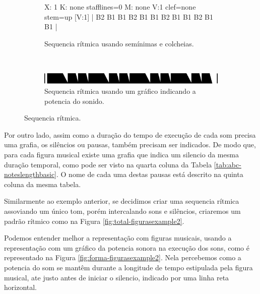 \begin{figure}[h]
    \centering
    \begin{subfigure}[b]{0.9\textwidth}
 \begin{abc}[name=abc-figurasexample1]
%
X: 1 %
K: none stafflines=0 %
M:  none %
V:1 clef=none stem=up %
%
[V:1] | B2 B1 B1 B2 B1 B1 B2 B1 B1 B2  B1 B1   |
%       
\end{abc}
	\caption{Sequencia rítmica usando semínimas e colcheias.}
	\label{fig:abc-figurasexample1}
    \end{subfigure}
    ~%
    \begin{subfigure}[b]{0.9\textwidth}
        \includegraphics[width=\textwidth]{chapters/cap-musica-basica/forma-figurasexample1.eps}
        \caption{Sequencia rítmica usando um gráfico indicando a potencia do sonido.}
        \label{fig:forma-figurasexample1b}
    \end{subfigure}
    \caption{Sequencia rítmica.}\label{fig:total-figurasexample1}
\end{figure}


Por outro lado, assim como a duração do tempo de execução de cada som precisa uma grafia,
os silêncios ou pausas, também precisam ser indicados. 
De modo que, para cada figura musical existe uma grafia que indica um silencio da mesma duração temporal,
como pode ser visto na quarta coluna da Tabela \ref{tab:abc-noteslengthbasic}.
O nome de cada uma destas pausas está descrito na quinta coluna da mesma tabela.

\begin{example}
Similarmente ao exemplo anterior, se decidimos criar uma sequencia rítmica assoviando um único tom, porém
intercalando sons e silêncios, criaremos um padrão rítmico como na Figura \ref{fig:total-figurasexample2}.

Podemos entender melhor a representação com figuras musicais, 
usando a representação com um gráfico da potencia sonora na execução dos sons,
como é representado na Figura \ref{fig:forma-figurasexample2}.
Nela percebemos como a potencia do som se mantêm durante a longitude de tempo estipulada pela figura musical, 
ate justo antes de iniciar o silencio, indicado por uma linha reta horizontal.
\end{example} 

